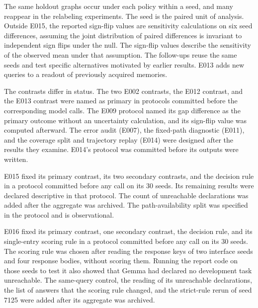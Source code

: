 \documentclass[11pt]{article}
\begin{document}
The same holdout graphs occur under each policy within a seed, and
many reappear in the relabeling experiments. The seed is the paired
unit of analysis.
Outside E015, the reported sign-flip values are sensitivity calculations
on six seed
differences, assuming the joint distribution of paired differences
is invariant to independent sign flips under the null. The sign-flip
values describe the sensitivity of the
observed mean
under that assumption. The follow-ups reuse the same seeds and test
specific alternatives motivated by earlier results. E013 adds new
queries to a readout of previously acquired memories.

The contrasts differ in status. The two E002 contrasts, the E012
contrast, and the E013 contrast were named as primary in protocols
committed before the corresponding model calls. The E009 protocol named
its gap difference as the primary outcome without an uncertainty
calculation, and its sign-flip value was computed afterward. The
error audit (E007), the fixed-path diagnostic (E011), and the coverage
split and trajectory replay (E014) were designed after the results
they examine. E014's
protocol was committed before its outputs were written.

E015 fixed its primary contrast, its two secondary contrasts, and the
decision rule in a protocol committed before any call on its 30 seeds.
Its remaining results were declared descriptive in that protocol. The
count of unreachable declarations was added after the aggregate was
archived. The path-availability split was specified in the protocol and
is observational.

E016 fixed its primary contrast, one secondary contrast, the decision
rule, and its single-entry scoring rule in a protocol committed before
any call on its 30 seeds. The scoring rule was chosen after reading the
response keys of two interface seeds and four response bodies, without
scoring them. Running the report code on those seeds to test it also
showed that Gemma had declared no development task unreachable. The
same-query control, the reading of its unreachable declarations, the
list of answers that the scoring rule changed, and the strict-rule
rerun of seed 7125 were added after its aggregate was archived.





\end{document}
